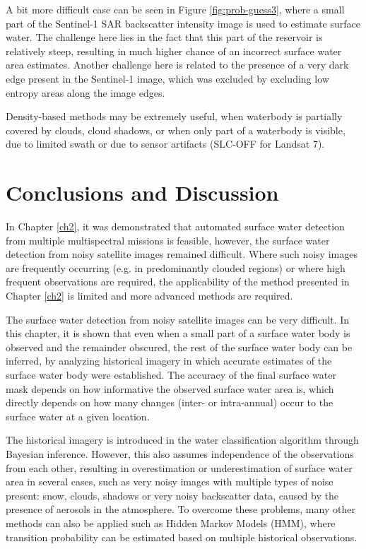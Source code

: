 A bit more difficult case can be seen in Figure \ref{fig:prob-guess3}, where a small part of the Sentinel-1 SAR backscatter intensity image is used to estimate surface water. The challenge here lies in the fact that this part of the reservoir is relatively steep, resulting in much higher chance of an incorrect surface water area estimates. Another challenge here is related to the presence of a very dark edge present in the Sentinel-1 image, which was excluded by excluding low entropy areas along the image edges. 

Density-based methods may be extremely useful, when waterbody is partially covered by clouds, cloud shadows, or when only part of a waterbody is visible, due to limited swath or due to sensor artifacts (SLC-OFF for Landsat 7). 

\section{Conclusions and Discussion}

In Chapter \ref{ch2}, it was demonstrated that automated surface water detection from multiple multispectral missions is feasible, however, the surface water detection from noisy satellite images remained difficult. Where such noisy images are frequently occurring (e.g. in predominantly clouded regions) or where high frequent observations are required, the applicability of the method presented in Chapter \ref{ch2} is limited and more advanced methods are required. 

The surface water detection from noisy satellite images can be very difficult. In this chapter, it is shown that even when a small part of a surface water body is observed and the remainder obscured, the rest of the surface water body can be inferred, by analyzing historical imagery in which accurate estimates of the surface water body were established. The accuracy of the final surface water mask depends on how informative the observed surface water area is, which directly depends on how many changes (inter- or intra-annual) occur to the surface water at a given location.

The historical imagery is introduced in the water classification algorithm through Bayesian inference. However, this also assumes independence of the observations from each other, resulting in overestimation or underestimation of surface water area in several cases, such as very noisy images with multiple types of noise present: snow, clouds, shadows or very noisy backscatter data, caused by the presence of aerosols in the atmosphere. To overcome these problems, many other methods can also be applied such as Hidden Markov Models (HMM), where transition probability can be estimated based on multiple historical observations.


